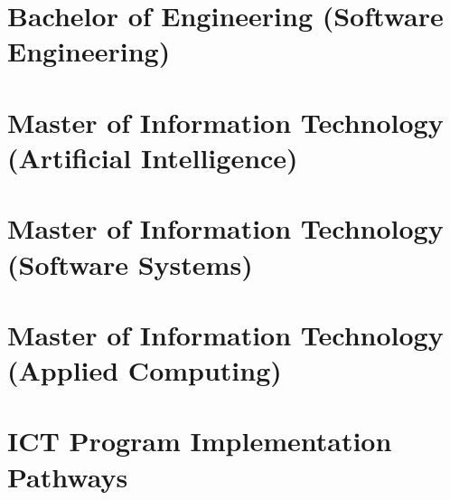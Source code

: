 \documentclass[10pt,a4paper]{report}
\begin{document}
\chapter{Bachelor of Engineering (Software Engineering)} %


\chapter{Master of Information Technology (Artificial Intelligence)}


\chapter{Master of Information Technology (Software Systems)}


\chapter{Master of Information Technology (Applied Computing)}


%


\chapter{ICT Program Implementation Pathways}


\end{document}

